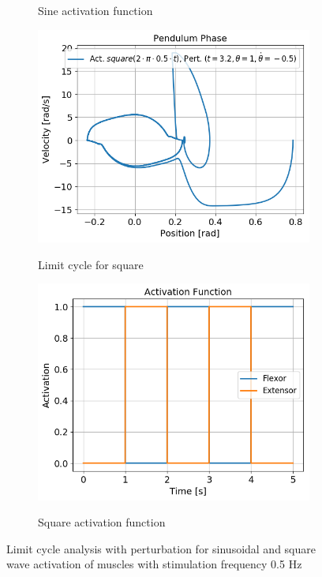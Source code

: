 \documentclass{cmc}
\begin{document}
\begin{figure}[H]
\begin{subfigure}[b]{0.49\textwidth}
    \caption{Sine activation function}
    \label{fig:Exercise2bActivationFunctionSin}
  \end{subfigure}
  \hspace{1pt}
    \begin{subfigure}[b]{0.49\textwidth}
    { \centering
      \includegraphics[width=\textwidth]{figures/2b_LimitCycle_square.png} }
    \caption{Limit cycle for square}
    \label{fig:Exercise2bLimitCycleSquare}
    \end{subfigure}
    \begin{subfigure}[b]{0.49\textwidth}
    { \centering
      \includegraphics[width=\textwidth]{figures/2b_ActivationFunction_square.png} }
    \caption{Square activation function}
    \label{fig:Exercise2bActivationFunctionSquare}
    \end{subfigure}
  \caption{Limit cycle analysis with perturbation for sinusoidal and square wave activation of muscles with stimulation frequency 0.5 Hz}
  \label{fig:Exercise2b}
\end{figure}
\end{document}
